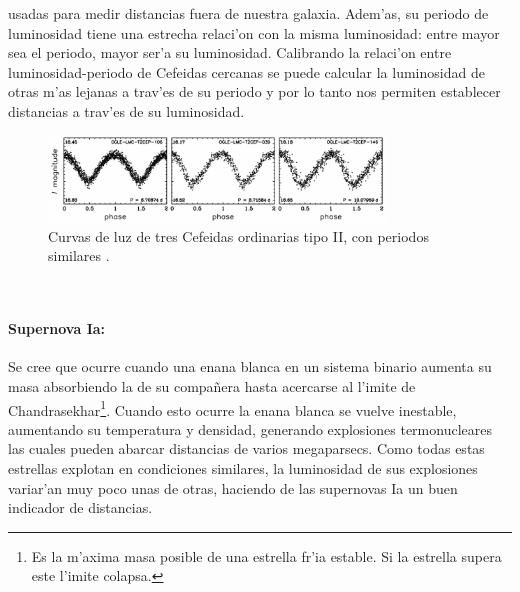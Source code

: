 usadas para medir distancias fuera de nuestra galaxia.
Adem'as, su periodo de luminosidad tiene una estrecha relaci'on con la misma luminosidad: entre mayor sea el periodo, mayor ser'a su luminosidad.
Calibrando la relaci'on entre luminosidad-periodo de Cefeidas cercanas se puede calcular la luminosidad de otras m'as lejanas
a trav'es de su periodo y por lo tanto nos permiten establecer distancias a trav'es de su luminosidad.
\begin{figure}[h!]
  \centering
\includegraphics[width=0.8\textwidth]{fig/cepheid.png}
 \caption{Curvas de luz de tres Cefeidas ordinarias tipo II, con periodos similares \cite{ceph}.}
  \end{figure}\\
\paragraph{Supernova Ia:} Se cree que ocurre cuando una enana blanca en un sistema binario aumenta su masa absorbiendo la de su
compa\~nera hasta acercarse al l'imite de Chandrasekhar\footnote{Es la m'axima masa posible de una estrella fr'ia estable. Si la estrella supera este l'imite  colapsa.}.
Cuando esto ocurre la enana blanca se vuelve inestable, aumentando su temperatura y densidad, generando explosiones
termonucleares las cuales pueden abarcar distancias de varios megaparsecs. Como todas estas estrellas explotan en condiciones
similares, la luminosidad de sus explosiones variar'an muy poco unas de otras, haciendo de las supernovas Ia un buen indicador de distancias.
